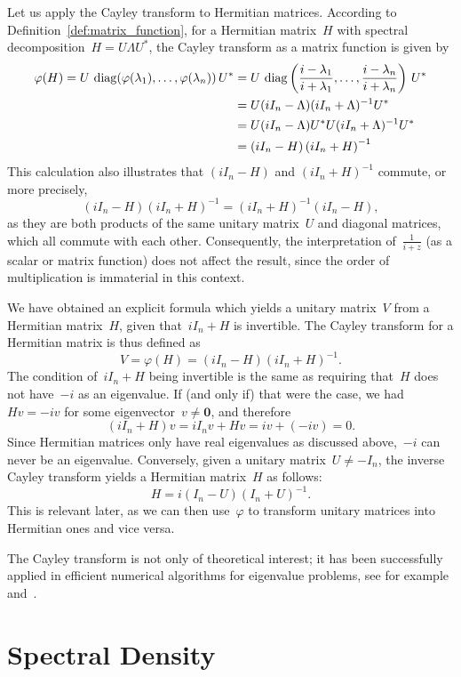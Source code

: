 Let us apply the Cayley transform to Hermitian matrices. According to Definition~\ref{def:matrix_function}, for a Hermitian matrix~$H$ with spectral decomposition~$H = U \Lambda U^*$, the Cayley transform as a matrix function is given by
\begin{align*}
    \varphi(H) = U \, \operatorname{diag}(\varphi(\lambda_1), \ldots, \varphi(\lambda_n)) \, U^* & = U \, \operatorname{diag}\left(\frac{i - \lambda_1}{i + \lambda_1}, \ldots, \frac{i - \lambda_n}{i + \lambda_n}\right) \, U^*\\
    & = U (i I_n - \Lambda) (i I_n + \Lambda)^{-1} U^*\\
    & = U (i I_n - \Lambda) U^* U (i I_n + \Lambda)^{-1} U^*\\
    & = (i I_n - H) \left( i I_n + H \right)^{-1}
\end{align*}
This calculation also illustrates that $(i I_n - H)$ and $(i I_n + H)^{-1}$ commute, or more precisely, 
\[
(i I_n - H)(i I_n + H)^{-1} = (i I_n + H)^{-1}(i I_n - H),
\]
as they are both products of the same unitary matrix~$U$ and diagonal matrices, which all commute with each other. Consequently, the interpretation of~$\frac{1}{i + z}$ (as a scalar or matrix function) does not affect the result, since the order of multiplication is immaterial in this context.

We have obtained an explicit formula which yields a unitary matrix~$V$ from a Hermitian matrix~$H$, given that~$i I_n + H$ is invertible. The Cayley transform for a Hermitian matrix is thus defined as
\[
V = \varphi(H) = (i I_n - H)(i I_n + H)^{-1}.
\]
The condition of~$i I_n + H$ being invertible is the same as requiring that~$H$ does not have~$-i$ as an eigenvalue. If (and only if) that were the case, we had~$Hv=-iv$ for some eigenvector~$v \neq \mathbf{0}$, and therefore
\[
(i I_n + H) v = i I_n v + H v = i v + (-i v) = 0.
\]
Since Hermitian matrices only have real eigenvalues as discussed above,~$-i$ can never be an eigenvalue. Conversely, given a unitary matrix~$U \neq -I_n$, the inverse Cayley transform yields a Hermitian matrix~$H$ as follows:
\[
H = i (I_n - U)(I_n + U)^{-1}.
\]
This is relevant later, as we can then use~$\varphi$ to transform unitary matrices into Hermitian ones and vice versa.

The Cayley transform is not only of theoretical interest; it has been successfully applied in efficient numerical algorithms for eigenvalue problems, see for example~\cite{aurentzmachvandebrilwatkins} and~\cite{meerbergenspenceroose}.

\section{Spectral Density}

